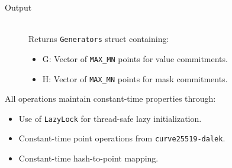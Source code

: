 \documentclass[12pt,a4paper]{article}
\begin{document}
\begin{description}
\item[Output] \hfill \\
Returns \texttt{Generators} struct containing: %
\begin{itemize}
\item G: Vector of \texttt{MAX\_MN} points for value commitments.  %
\item H: Vector of \texttt{MAX\_MN} points for mask commitments.  %
\end{itemize}
\end{description}

All operations maintain constant-time properties through:
\begin{itemize}
\item Use of \texttt{LazyLock} for thread-safe lazy initialization.  %
\item Constant-time point operations from \texttt{curve25519-dalek}.  %
\item Constant-time hash-to-point mapping.  %
\end{itemize}

\end{document}
